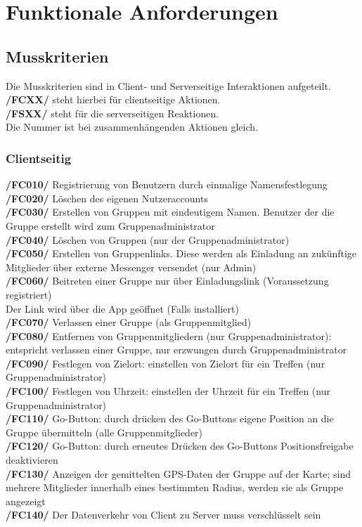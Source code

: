 \newpage
\section{Funktionale Anforderungen}
\subsection{Musskriterien}
Die Musskriterien sind in Client- und Serverseitige Interaktionen aufgeteilt.\\
\textbf{/FCXX/} steht hierbei für clientseitige Aktionen.\\
\textbf{/FSXX/} steht für die serverseitigen Reaktionen.\\
Die Nummer ist bei zusammenhängenden Aktionen gleich.\\
\subsubsection{Clientseitig}
     \textbf{/FC010/} Registrierung von Benutzern durch einmalige Namensfestlegung\\
     \textbf{/FC020/} Löschen des eigenen Nutzeraccounts\\
     \textbf{/FC030/} Erstellen von Gruppen mit eindeutigem Namen. Benutzer der die Gruppe erstellt wird zum Gruppenadministrator\\
     \textbf{/FC040/} Löschen von Gruppen (nur der Gruppenadministrator)   \\
     \textbf{/FC050/} Erstellen von Gruppenlinks. Diese werden als Einladung an zukünftige Mitglieder über externe Messenger versendet (nur Admin)\\
     \textbf{/FC060/} Beitreten einer Gruppe nur über Einladungslink (Voraussetzung registriert) \\
     Der Link wird über die App geöffnet (Falls installiert) \\
     \textbf{/FC070/} Verlassen einer Gruppe (als Gruppenmitglied)\\
     \textbf{/FC080/} Entfernen von Gruppenmitgliedern (nur Gruppenadministrator): entspricht verlassen einer Gruppe, nur erzwungen durch Gruppenadministrator\\
     \textbf{/FC090/} Festlegen von Zielort: einstellen von Zielort für ein Treffen (nur Gruppenadministrator)\\
     \textbf{/FC100/} Festlegen von Uhrzeit: einstellen der Uhrzeit für ein Treffen (nur Gruppenadministrator) \\
     \textbf{/FC110/} Go-Button: durch drücken des Go-Buttons eigene Position an die Gruppe übermitteln (alle Gruppenmitglieder)\\
     \textbf{/FC120/} Go-Button: durch erneutes Drücken des Go-Buttons Positionsfreigabe deaktivieren\\
     \textbf{/FC130/} Anzeigen der gemittelten GPS-Daten der Gruppe auf der Karte; sind mehrere Mitglieder innerhalb eines bestimmten Radius,
     werden sie als Gruppe angezeigt\\
     \textbf{/FC140/} Der Datenverkehr von Client zu Server muss verschlüsselt sein\\
     
